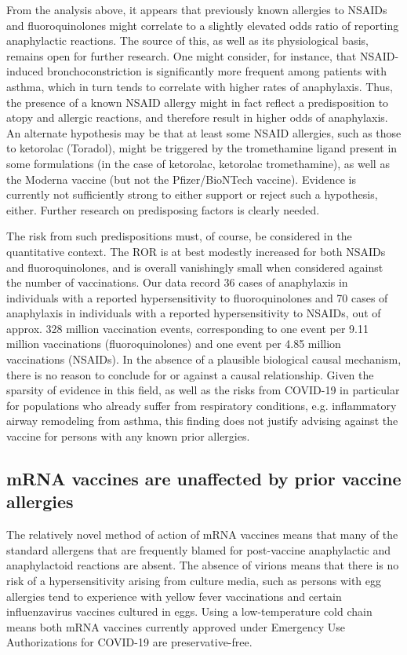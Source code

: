 \documentclass{article}
\begin{document}
From the analysis above, it appears that previously known allergies to NSAIDs and fluoroquinolones might correlate to a slightly elevated odds ratio of reporting anaphylactic reactions.
The source of this, as well as its physiological basis, remains open for further research.
One might consider, for instance, that NSAID-induced bronchoconstriction is significantly more frequent among patients with asthma,\cite{morales2015nsaid} which in turn tends to correlate with higher rates of anaphylaxis.
Thus, the presence of a known NSAID allergy might in fact reflect a predisposition to atopy and allergic reactions, and therefore result in higher odds of anaphylaxis.
An alternate hypothesis may be that at least some NSAID allergies, such as those to ketorolac (Toradol), might be triggered by the tromethamine ligand present in some formulations (in the case of ketorolac, ketorolac tromethamine), as well as the Moderna vaccine (but not the Pfizer/BioNTech vaccine).
Evidence is currently not sufficiently strong to either support or reject such a hypothesis, either.
Further research on predisposing factors is clearly needed.

The risk from such predispositions must, of course, be considered in the quantitative context.
The ROR is at best modestly increased for both NSAIDs and fluoroquinolones, and is overall vanishingly small when considered against the number of vaccinations.
Our data record 36 cases of anaphylaxis in individuals with a reported hypersensitivity to fluoroquinolones and 70 cases of anaphylaxis in individuals with a reported hypersensitivity to NSAIDs, out of approx. 328 million vaccination events, corresponding to one event per 9.11 million vaccinations (fluoroquinolones) and one event per 4.85 million vaccinations (NSAIDs).
In the absence of a plausible biological causal mechanism, there is no reason to conclude for or against a causal relationship.
Given the sparsity of evidence in this field, as well as the risks from COVID-19 in particular for populations who already suffer from respiratory conditions, e.g. inflammatory airway remodeling from asthma, this finding does not justify advising against the vaccine for persons with any known prior allergies.


\subsection{mRNA vaccines are unaffected by prior vaccine allergies}

The relatively novel method of action of mRNA vaccines means that many of the standard allergens that are frequently blamed for post-vaccine anaphylactic and anaphylactoid reactions are absent.
The absence of virions means that there is no risk of a hypersensitivity arising from culture media, such as persons with egg allergies tend to experience with yellow fever vaccinations and certain influenzavirus vaccines cultured in eggs.
Using a low-temperature cold chain means both mRNA vaccines currently approved under Emergency Use Authorizations for COVID-19 are preservative-free.
\end{document}
